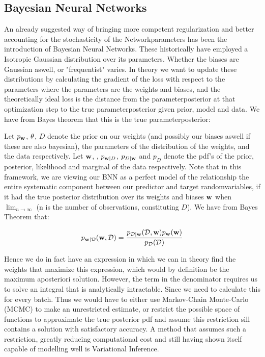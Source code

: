 \documentclass[nofootinbib,UKenglish,nobalancelastpage,12pt]{article}
\newcommand{\vect}{\ensuremath{\mathbf}}
\begin{document}
\subsection{Bayesian Neural Networks}

An already suggested way of bringing more competent regularization and better accounting for the stochasticity of the Networkparameters has been the introduction of Bayesian Neural Networks. These historically have employed a Isotropic Gaussian distribution over its parameters. Whether the biases are Gaussian aswell, or "frequentist" varies. In theory we want to update these distributions by calculating the gradient of the loss with respect to the parameters where the parameters are the weights and biases, and the theoretically ideal loss is the distance from the parameterposterior at that optimization step to the true parameterposterior given prior, model and data. We have from Bayes theorem that this is the true parameterposterior:

Let $p_{\vect{w}}$, $\vect{\theta}$, $D$ denote the prior on our weights (and possibly our biases aswell if these are also bayesian), the parameters of the distribution of the weights, and the data respectively. Let $\vect{w}$, , $p_{\vect{w}|D}$, $p_{D|\vect{w}}$ and $p_{D}$ denote the pdf's of the prior, posterior, likelihood and marginal of the data respectively. Note that in this framework, we are viewing our BNN as a perfect model of the relationship the entire systematic component between our predictor and target randomvariables, if it had the true posterior distribution over its weights and biases $\vect{w}$ when $\lim_{n \to \infty}$ (n is the number of observations, constituting $D$). We have from Bayes Theorem that:


$$
p_{\vect{w}|\mathcal{D}}(\vect{w}, \mathcal{D}) = \frac{p_{\mathcal{D}|\vect{w}}( \mathcal{D},\vect{w})p_{\vect{w}}(\vect{w})}{p_{\mathcal{D}}(\mathcal{D})}
$$

Hence we do in fact have an expression in which we can in theory find the weights that maximize this expression, which would by definition be the maximum aposteriori solution. However, the term in the denominator requires us to solve an integral that is analytically intractable. Since we need to calculate this for every batch. Thus we would have to either use Markov-Chain Monte-Carlo (MCMC) to make an unrestricted estimate, or restrict the possible space of functions to approximate the true posterior pdf and assume this restriction sill contains a solution with satisfactory accuracy. A method that assumes such a restriction, greatly reducing computational cost and still having shown itself capable of modelling well is Variational Inference.
\end{document}
